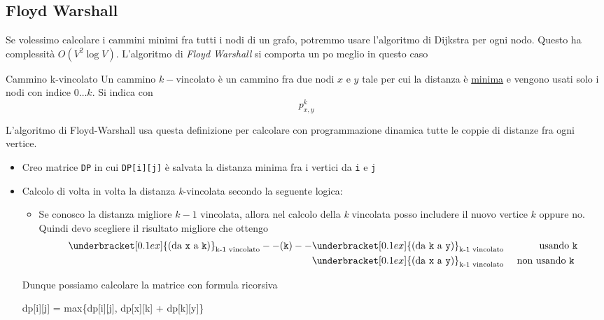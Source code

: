 \subsection{Floyd Warshall}\label{Floyd-Warshall}
Se volessimo calcolare i cammini minimi fra tutti i nodi di un grafo, potremmo usare l'algoritmo di Dijkstra per ogni nodo. Questo ha complessità $ O\left(V^2 \log V\right) $. L'algoritmo di \textit{Floyd Warshall} si comporta un po meglio in questo caso

\begin{definizione}{Cammino k-vincolato}
	Un cammino $ k- $vincolato è un cammino fra due nodi $ x $ e $ y $ tale per cui la distanza è \underline{minima} e vengono usati solo i nodi con indice $ 0 \ldots k $. Si indica con
	\[
		p_{x,y}^{k}
	\]
\end{definizione}
L'algoritmo di Floyd-Warshall usa questa definizione per calcolare con programmazione dinamica tutte le coppie di distanze fra ogni vertice.
\begin{itemize}
	\item Creo matrice \verb|DP| in cui \verb|DP[i][j]| è salvata la distanza minima fra i vertici da \verb|i| e  \verb|j|
	\item Calcolo di volta in volta la distanza \textit{k}-vincolata secondo la seguente logica:
	      \begin{itemize}
		      \item Se conosco la distanza migliore $ k-1 $ vincolata, allora nel calcolo della \textit{k} vincolata posso includere il nuovo vertice $ k $ oppure no. Quindi devo scegliere il risultato migliore che ottengo
		            \begin{align*}
			            \underbracket[0.1ex]{\text{(da {\ttfamily x} a {\ttfamily k})}}_{\text{k-1 vincolato}} -- (\text{{\ttfamily k}}) -- \underbracket[0.1ex]{\text{(da {\ttfamily k} a {\ttfamily y})}}_{\text{k-1 vincolato}} &  & \text{ usando {\ttfamily k}}      \\
			            \underbracket[0.1ex]{\text{(da {\ttfamily x} a {\ttfamily y})}}_{\text{k-1 vincolato}}                                                                                                                     &  & \text{ non usando {\ttfamily k} }
		            \end{align*}
	      \end{itemize}
	      Dunque possiamo calcolare la matrice con formula ricorsiva
	      \begin{center}
		      \ttfamily
		      dp[i][j] = max\{dp[i][j], dp[x][k] + dp[k][y]\}
	      \end{center}
\end{itemize}

